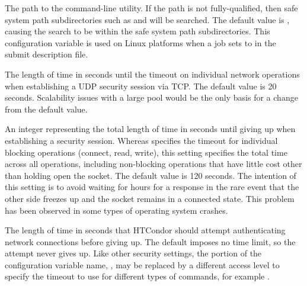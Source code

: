 \begin{description}
\label{param:EcryptfsAddPassphrase}
\item[\Macro{ECRYPTFS\_ADD\_PASSPHRASE}]
  The path to the  command-line utility. 
  If the path is not fully-qualified, 
  then safe system path subdirectories such as  and
   will be searched.  
  The default value is ,
  causing the search to be within the safe system path subdirectories.
  This configuration variable is used on Linux platforms when a job
  sets  to  in the
  submit description file.

\label{param:SecTCPSessionTimeout}
\item[\Macro{SEC\_TCP\_SESSION\_TIMEOUT}]
  The length of time in seconds until the timeout
  on individual network operations when establishing a UDP security
  session via TCP.
  The default value is 20 seconds.
  Scalability issues with a large pool would be the only basis
  for a change from the default value.

\label{param:SecTCPSessionDeadline}
\item[\Macro{SEC\_TCP\_SESSION\_DEADLINE}]
  An integer representing the total length of time in seconds until giving up
  when establishing a security session.  Whereas
   specifies the timeout
  for individual blocking operations (connect, read, write), this
  setting specifies the total time across all operations, including
  non-blocking operations that have little cost other than holding
  open the socket.
  The default value is 120 seconds.
  The intention of this setting is to avoid waiting for hours
  for a response in the rare event that the other side
  freezes up and the socket remains in a connected state.
  This problem has been observed in some types of operating system
  crashes.

\label{param:SecDefaultAuthenticationTimeout}
\item[\Macro{SEC\_DEFAULT\_AUTHENTICATION\_TIMEOUT}]
  The length of time in seconds that HTCondor should attempt
  authenticating network connections before giving up.
  The default imposes no time limit, so the attempt never gives up.
  Like other security settings, the portion of the configuration variable
  name, , 
  may be replaced by a different access level to specify the timeout to use for
  different types of commands, for example
  .


\end{description}
